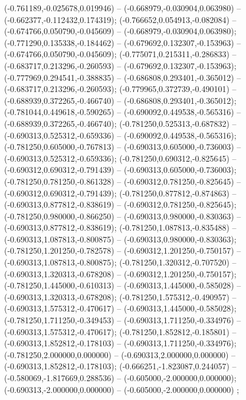  (-0.761189,-0.025678,0.019946) -- (-0.668979,-0.030904,0.063980) -- (-0.662377,-0.112432,0.174319);
 (-0.766652,0.054913,-0.082084) -- (-0.674766,0.050790,-0.045609) -- (-0.668979,-0.030904,0.063980);
 (-0.771290,0.135338,-0.184462) -- (-0.679692,0.132307,-0.153963) -- (-0.674766,0.050790,-0.045609);
 (-0.775071,0.215311,-0.286833) -- (-0.683717,0.213296,-0.260593) -- (-0.679692,0.132307,-0.153963);
 (-0.777969,0.294541,-0.388835) -- (-0.686808,0.293401,-0.365012) -- (-0.683717,0.213296,-0.260593);
 (-0.779965,0.372739,-0.490101) -- (-0.688939,0.372265,-0.466740) -- (-0.686808,0.293401,-0.365012);
 (-0.781044,0.449618,-0.590265) -- (-0.690092,0.449538,-0.565316) -- (-0.688939,0.372265,-0.466740);
 (-0.781250,0.525313,-0.687832) -- (-0.690313,0.525312,-0.659336) -- (-0.690092,0.449538,-0.565316);
 (-0.781250,0.605000,-0.767813) -- (-0.690313,0.605000,-0.736003) -- (-0.690313,0.525312,-0.659336);
 (-0.781250,0.690312,-0.825645) -- (-0.690312,0.690312,-0.791439) -- (-0.690313,0.605000,-0.736003);
 (-0.781250,0.781250,-0.861328) -- (-0.690312,0.781250,-0.825645) -- (-0.690312,0.690312,-0.791439);
 (-0.781250,0.877812,-0.874863) -- (-0.690313,0.877812,-0.838619) -- (-0.690312,0.781250,-0.825645);
 (-0.781250,0.980000,-0.866250) -- (-0.690313,0.980000,-0.830363) -- (-0.690313,0.877812,-0.838619);
 (-0.781250,1.087813,-0.835488) -- (-0.690313,1.087813,-0.800875) -- (-0.690313,0.980000,-0.830363);
 (-0.781250,1.201250,-0.782578) -- (-0.690312,1.201250,-0.750157) -- (-0.690313,1.087813,-0.800875);
 (-0.781250,1.320312,-0.707520) -- (-0.690313,1.320313,-0.678208) -- (-0.690312,1.201250,-0.750157);
 (-0.781250,1.445000,-0.610313) -- (-0.690313,1.445000,-0.585028) -- (-0.690313,1.320313,-0.678208);
 (-0.781250,1.575312,-0.490957) -- (-0.690313,1.575312,-0.470617) -- (-0.690313,1.445000,-0.585028);
 (-0.781250,1.711250,-0.349453) -- (-0.690313,1.711250,-0.334976) -- (-0.690313,1.575312,-0.470617);
 (-0.781250,1.852812,-0.185801) -- (-0.690313,1.852812,-0.178103) -- (-0.690313,1.711250,-0.334976);
 (-0.781250,2.000000,0.000000) -- (-0.690313,2.000000,0.000000) -- (-0.690313,1.852812,-0.178103);
 (-0.666251,-1.823087,0.244057) -- (-0.580069,-1.817669,0.288536) -- (-0.605000,-2.000000,0.000000);
 (-0.690313,-2.000000,0.000000) -- (-0.605000,-2.000000,0.000000) ;
